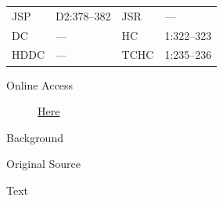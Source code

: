 				\begin{tabular}{p{0.5in}p{1in}p{0.5in}p{1in}}
				JSP	 	& D2:378--382		& JSR 		& --- \\
				DC	 	& --- 				& HC 		& 1:322--323 \\
				HDDC 	& ---				& TCHC 		& 1:235--236 \\
				\end{tabular}
			
			\begin{description}
				\item[Online Access] \href{https://www.josephsmithpapers.org/paper-summary/minutes-22-23-january-1833/1}{Here}
			\end{description}
			
			\begin{description}
				\item[Background]
			\end{description}
			
			
			\begin{description}
				\item[Original Source]
			\end{description}
			
			
			\begin{description}
				\item[Text]
			\end{description}
			
				
